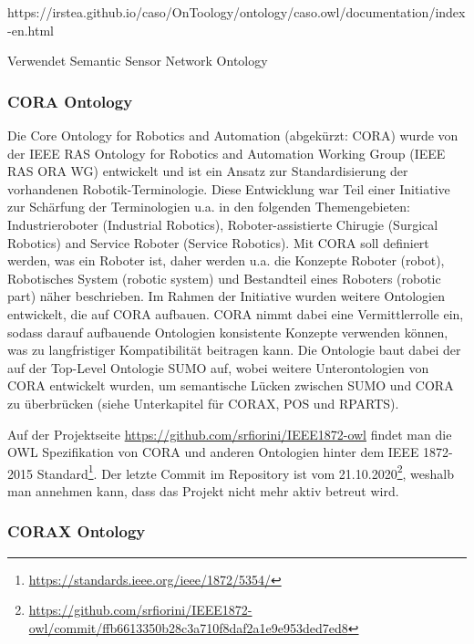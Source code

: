 \documentclass{article}
\begin{document}
https://irstea.github.io/caso/OnToology/ontology/caso.owl/documentation/index-en.html

Verwendet Semantic Sensor Network Ontology

\subsubsection{CORA Ontology}


Die Core Ontology for Robotics and Automation (abgekürzt: CORA) \cite{prestes2014core} wurde von der IEEE RAS Ontology for Robotics and Automation Working Group (IEEE RAS ORA WG) entwickelt und ist ein Ansatz zur Standardisierung der vorhandenen Robotik-Terminologie.
Diese Entwicklung war Teil einer Initiative zur Schärfung der Terminologien u.a. in den folgenden Themengebieten: Industrieroboter (Industrial Robotics), Roboter-assistierte Chirugie (Surgical Robotics) and Service Roboter (Service Robotics).
Mit CORA soll definiert werden, was ein Roboter ist, daher werden u.a. die Konzepte Roboter (robot), Robotisches System (robotic system) und Bestandteil eines Roboters (robotic part) näher beschrieben.
Im Rahmen der Initiative wurden weitere Ontologien entwickelt, die auf CORA aufbauen.
CORA nimmt dabei eine Vermittlerrolle ein, sodass darauf aufbauende Ontologien konsistente Konzepte verwenden können, was zu langfristiger Kompatibilität beitragen kann.
Die Ontologie baut dabei der auf der Top-Level Ontologie SUMO auf, wobei weitere Unterontologien von CORA entwickelt wurden, um semantische Lücken zwischen SUMO und CORA zu überbrücken (siehe Unterkapitel für CORAX, POS und RPARTS).

Auf der Projektseite \url{https://github.com/srfiorini/IEEE1872-owl} findet man die OWL Spezifikation von CORA und anderen Ontologien hinter dem IEEE 1872-2015 Standard\footnote{\url{https://standards.ieee.org/ieee/1872/5354/}}. Der letzte Commit im Repository ist vom 21.10.2020\footnote{\url{https://github.com/srfiorini/IEEE1872-owl/commit/ffb6613350b28c3a710f8daf2a1e9e953ded7ed8}}, weshalb man annehmen kann, dass das Projekt nicht mehr aktiv betreut wird.

\subsubsection{CORAX Ontology}

\end{document}
